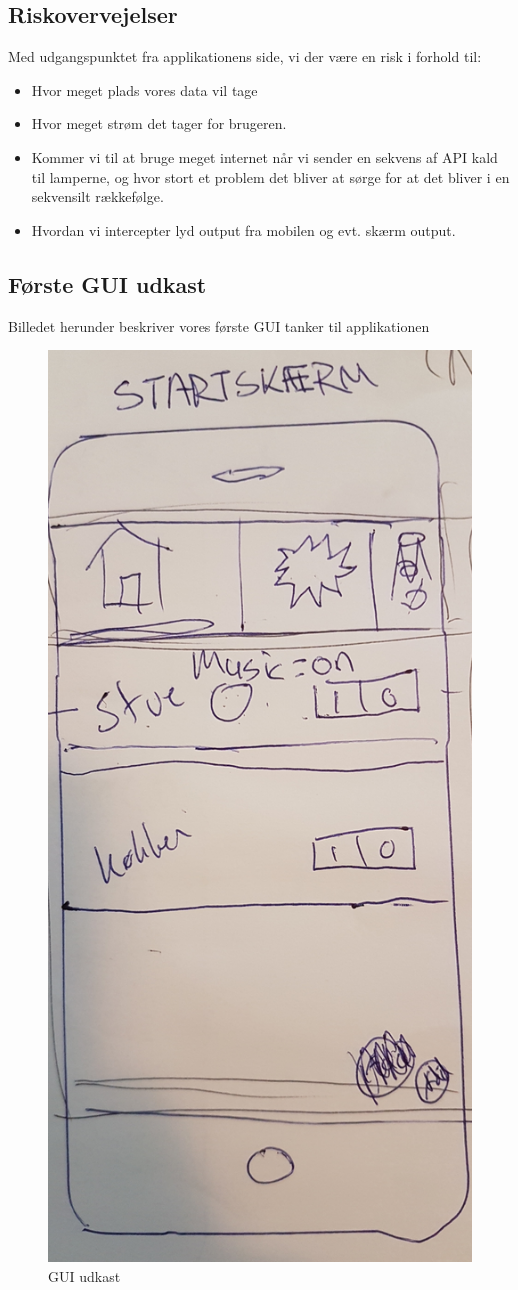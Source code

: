 		\subsection{Riskovervejelser}
		Med udgangspunktet fra applikationens side, vi der være en risk i forhold til:
		\begin{itemize}
			\item Hvor meget plads vores data vil tage
			\item Hvor meget strøm det tager for brugeren. 
			\item Kommer vi til at bruge meget internet når vi sender en sekvens af API kald til lamperne, og hvor stort et problem det bliver at sørge for at det bliver i en sekvensilt rækkefølge.
			\item Hvordan vi intercepter lyd output fra mobilen og evt. skærm output. \newline
		\end{itemize}	
	
		\subsection{Første GUI udkast}
		Billedet herunder beskriver vores første GUI tanker til applikationen
		\begin{figure}[H]
			\centering
			\includegraphics[width=0.6\linewidth, height=1\linewidth]{Kravspecifikation/GUI}
			\caption{GUI udkast}
			\label{fig:GUI udkast}
		\end{figure}
		\newpage
		
